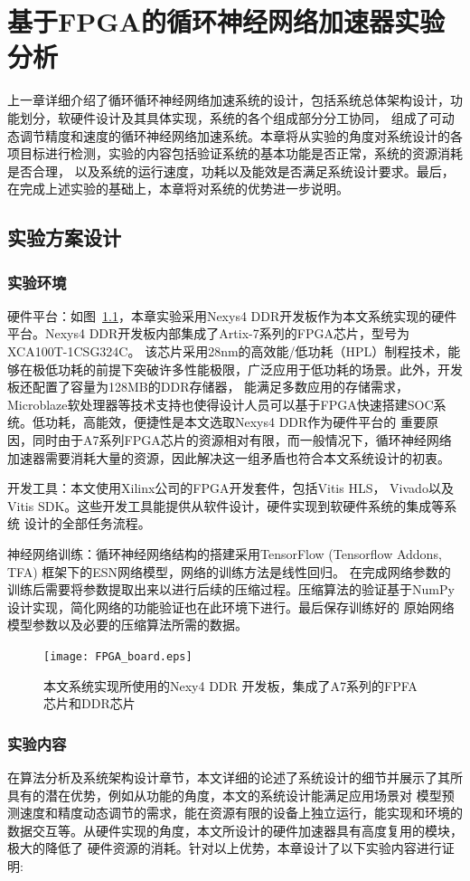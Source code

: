 \chapter{基于FPGA的循环神经网络加速器实验分析}
上一章详细介绍了循环循环神经网络加速系统的设计，包括系统总体架构设计，功能划分，软硬件设计及其具体实现，系统的各个组成部分分工协同，
组成了可动态调节精度和速度的循环神经网络加速系统。本章将从实验的角度对系统设计的各项目标进行检测，实验的内容包括验证系统的基本功能是否正常，系统的资源消耗是否合理，
以及系统的运行速度，功耗以及能效是否满足系统设计要求。最后，在完成上述实验的基础上，本章将对系统的优势进一步说明。
\section{实验方案设计}
\subsection{实验环境}
硬件平台：如图~\ref{fig_board}，本章实验采用Nexys4 DDR开发板作为本文系统实现的硬件平台。Nexys4 DDR开发板内部集成了Artix-7系列的FPGA芯片，型号为XCA100T-1CSG324C。
该芯片采用28nm的高效能/低功耗（HPL）制程技术，能够在极低功耗的前提下突破许多性能极限，广泛应用于低功耗的场景。此外，开发板还配置了容量为128MB的DDR存储器，
能满足多数应用的存储需求，Microblaze软处理器等技术支持也使得设计人员可以基于FPGA快速搭建SOC系统。低功耗，高能效，便捷性是本文选取Nexys4 DDR作为硬件平台的
重要原因，同时由于A7系列FPGA芯片的资源相对有限，而一般情况下，循环神经网络加速器需要消耗大量的资源，因此解决这一组矛盾也符合本文系统设计的初衷。

开发工具：本文使用Xilinx公司的FPGA开发套件，包括Vitis HLS， Vivado以及Vitis SDK。这些开发工具能提供从软件设计，硬件实现到软硬件系统的集成等系统
设计的全部任务流程。

神经网络训练：循环神经网络结构的搭建采用TensorFlow (Tensorflow Addons, TFA) 框架下的ESN网络模型，网络的训练方法是线性回归。
在完成网络参数的训练后需要将参数提取出来以进行后续的压缩过程。压缩算法的验证基于NumPy设计实现，简化网络的功能验证也在此环境下进行。最后保存训练好的
原始网络模型参数以及必要的压缩算法所需的数据。
\begin{figure}
	\centering
	\texttt{[image: FPGA\_board.eps]}
	\caption{本文系统实现所使用的Nexy4 DDR 开发板，集成了A7系列的FPFA芯片和DDR芯片}
	\label{fig_board}
\end{figure}
\subsection{实验内容}
在算法分析及系统架构设计章节，本文详细的论述了系统设计的细节并展示了其所具有的潜在优势，例如从功能的角度，本文的系统设计能满足应用场景对
模型预测速度和精度动态调节的需求，能在资源有限的设备上独立运行，能实现和环境的数据交互等。从硬件实现的角度，本文所设计的硬件加速器具有高度复用的模块，极大的降低了
硬件资源的消耗。针对以上优势，本章设计了以下实验内容进行证明:

